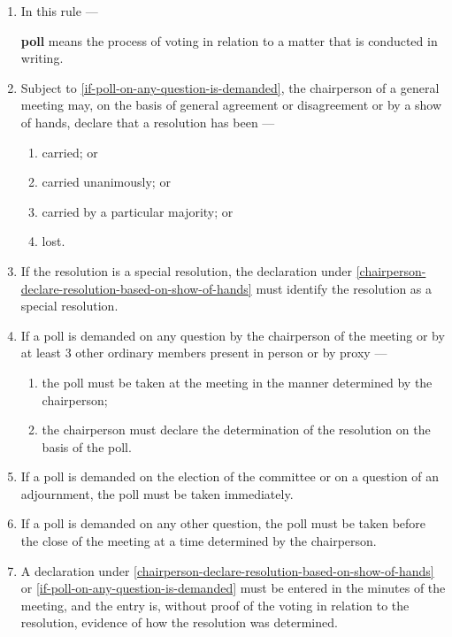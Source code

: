 \documentclass[../constitution.tex]{subfiles}
\begin{document}
\begin{enumerate}

\item In this rule ---
  
  \textbf{poll} means the process of voting in relation to a matter that is conducted in writing.

\item Subject to  \ref{if-poll-on-any-question-is-demanded}, the chairperson of a general meeting may, on the basis of general agreement or disagreement or by a show of hands, declare that a resolution has been --- \label{chairperson-declare-resolution-based-on-show-of-hands}

  \begin{enumerate}
  
  \item carried; or
  \item carried unanimously; or
  \item carried by a particular majority; or
  \item lost.
  \end{enumerate}
\item If the resolution is a special resolution, the declaration under  \ref{chairperson-declare-resolution-based-on-show-of-hands} must identify the resolution as a special resolution.
\item If a poll is demanded on any question by the chairperson of the meeting or by at least 3 other ordinary members present in person or by proxy --- \label{if-poll-on-any-question-is-demanded}

  \begin{enumerate}
  
  \item the poll must be taken at the meeting in the manner determined by the chairperson;
  \item the chairperson must declare the determination of the resolution on the basis of the poll.
  \end{enumerate}
\item If a poll is demanded on the election of the committee  or on a question of an adjournment, the poll must be taken immediately.
\item If a poll is demanded on any other question, the poll must be taken before the close of the meeting at a time determined by the chairperson.
\item A declaration under  \ref{chairperson-declare-resolution-based-on-show-of-hands} or \ref{if-poll-on-any-question-is-demanded} must be entered in the minutes of the meeting, and the entry is, without proof of the voting in relation to the resolution, evidence of how the resolution was determined.
\end{enumerate}
\end{document}
